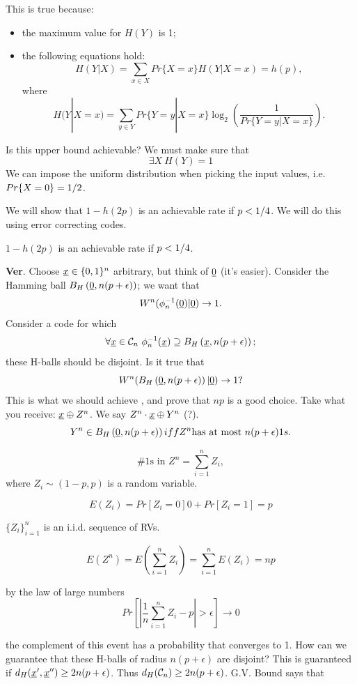 This is true because:
\begin{itemize}
	\item the maximum value for $H(Y)$ is 1;
	\item the following equations hold:
	\[H(Y|X) = \sum_{x\in X}Pr\{X=x\}H(Y|X=x) = h(p),\] where 
	\[H(Y|X=x) = \sum_{y \in Y}Pr\{Y=y|X=x\}\log_2\left(\dfrac{1}{Pr\{Y=y | X=x\}} \right).\]
\end{itemize} 

Is this upper bound achievable? We must make sure that $$\exists X\ H(Y) =1$$
We can impose the uniform distribution when picking the input values, i.e. $Pr\{X = 0\} = {1}/{2}$.

We will show that $1-h(2p)$ is an achievable rate if $p < {1}/{4}$. We will do this using error correcting codes.

\begin{obs}
 $1-h(2p)$ is an achievable rate if $p < {1}/{4}$.
\end{obs}

\noindent\textbf{Ver}. Choose $\underline{x} \in \{0, 1\}^n$ arbitrary, but think of $\underline{0}$ (it's easier). Consider the Hamming ball $B_H\left(\underline{0}, n(p+\epsilon)\right)$; we want that $$W^n(\phi^{-1}_n(\underline{0}) | \underline{0}) \rightarrow 1.$$ Consider a code for which $$\forall \underline{x} \in \mathcal{C}_n\ \phi^{-1}_n(\underline{x}) \supseteq B_H\left(\underline{x}, n(p+\epsilon)\right);$$ these H-balls should be disjoint. Is it true that $$W^n(B_H\left(\underline{0}, n(p+\epsilon)\right) | \underline{0}) \rightarrow 1?$$ This is what we should achieve , and prove that $np$ is a good choice. Take what you receive: $\underline{x} \oplus Z^n$. We say $Z^n \cdot \underline{x} \oplus Y^n$ (?).
\[
 Y^n \in B_H\left(\underline{0}, n(p+\epsilon)\right) iff Z^n \text{has at most}\ n(p+\epsilon) 1s. 
\]

\[
 \text{\#1s in }Z^n = \sum_{i=1}^n Z_i,
\]
where $Z_i \sim (1-p, p)$ is a random variable.

\[
 E(Z_i) = Pr[Z_i = 0]0 + Pr[Z_i = 1] = p
\]

$\{Z_i\}_{i=1}^n$ is an i.i.d. sequence of RVs.

\[
E(Z^n) = E(\sum_{i=1}^nZ_i) = \sum_{i=1}^nE(Z_i) = np
\]

by the law of large numbers 
\[
Pr\left[\left|\dfrac{1}{n} \sum_{i=1}^nZ_i -p \right| > \epsilon \right] \rightarrow 0
\]

the complement of this event has a probability that converges to 1. How can we guarantee that these H-balls of radius $n(p+\epsilon)$ are disjoint? This is guaranteed if $d_H(\underline{x}',\underline{x}'') \geq 2n(p+\epsilon)$. Thus $d_H(\mathcal{C}_n) \geq 2n(p+\epsilon)$. G.V. Bound says that

